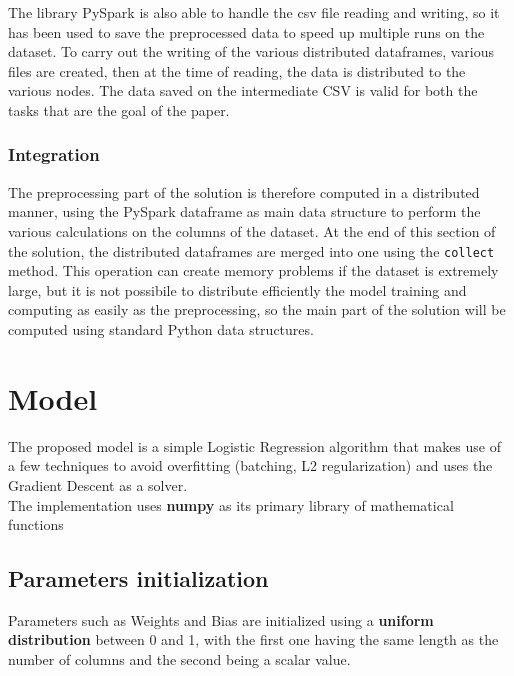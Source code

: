 \documentclass[
	letterpaper, %
	10pt, %
]{class}
\begin{document}
The library PySpark is also able to handle the csv file reading and writing, so it has been used to save the preprocessed data to speed up multiple runs on the dataset. To carry out the writing of the various distributed dataframes, various files are created, then at the time of reading, the data is distributed to the various nodes. The data saved on the intermediate CSV is valid for both the tasks that are the goal of the paper.\\

\subsubsection{Integration}

The preprocessing part of the solution is therefore computed in a distributed manner, using the PySpark dataframe as main data structure to perform the various calculations on the columns of the dataset.
At the end of this section of the solution, the distributed dataframes are merged into one using the \texttt{collect} method. This operation can create memory problems if the dataset is extremely large, but it is not possibile to distribute efficiently the model training
and computing as easily as the preprocessing, so the main part of the solution will be computed using standard Python data structures.


\section{Model}

The proposed model is a simple Logistic Regression \cite{logistic} algorithm that makes use of a few techniques to avoid overfitting (batching, L2 regularization) and uses the Gradient Descent as a solver.\\
The implementation uses \textbf{numpy} \cite{numpy} as its primary library of mathematical functions

\subsection{Parameters initialization}
Parameters such as Weights and Bias are initialized using a \textbf{uniform distribution} between 0 and 1, with the first one having the same length as the number of columns and the second being a scalar value.
\end{document}
